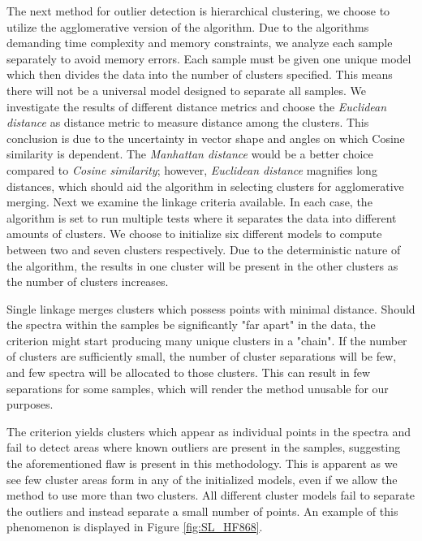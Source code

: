 The next method for outlier detection is hierarchical clustering, we choose to utilize the agglomerative version of the algorithm. Due to the algorithms demanding time complexity and memory constraints, we analyze each sample separately to avoid memory errors. Each sample must be given one unique model which then divides the data into  the number of clusters specified. This means there will not be a universal model designed to separate all samples. We investigate the results of different distance metrics and choose the \textit{Euclidean distance} as distance metric to measure distance among the clusters. This conclusion is due to the uncertainty in vector shape and angles on which Cosine similarity is dependent. The \textit{Manhattan distance} would be a better choice compared to \textit{Cosine similarity}; however, \textit{Euclidean distance} magnifies long distances, which should aid the algorithm in selecting clusters for agglomerative merging. Next we examine the linkage criteria available. In each case, the algorithm is set to run multiple tests where it separates the data into different amounts of clusters. We choose to initialize six different models to compute between two and seven clusters respectively. Due to the deterministic nature of the algorithm, the results in one cluster will be present in the other clusters as the number of clusters increases.

Single linkage merges clusters which possess points with minimal distance. Should the spectra within the samples be significantly "far apart" in the data, the criterion might start producing many unique clusters in a "chain". If the number of clusters are sufficiently small, the number of cluster separations will be few, and few spectra will be allocated to those clusters. This can result in few separations for some samples, which will render the method unusable for our purposes.

The criterion yields clusters which appear as individual points in the spectra and fail to detect areas where known outliers are present in the samples, suggesting the aforementioned flaw is present in this methodology. This is apparent as we see few cluster areas form in any of the initialized models, even if we allow the method to use more than two clusters. All different cluster models fail to separate the outliers and instead separate a small number of points. An example of this phenomenon is displayed in Figure \ref{fig:SL_HF868}.

